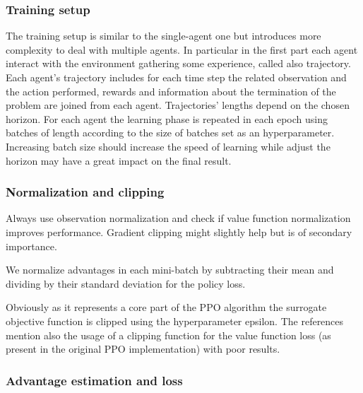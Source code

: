 \documentclass[11pt, a4paper, hidelinks]{report}
\begin{document}

\subsubsection{Training setup}

The training setup is similar to the single-agent one but introduces more complexity to deal with multiple agents.
In particular in the first part each agent interact with the environment gathering some experience, called also trajectory.
Each agent's trajectory includes for each time step the related observation and the action performed, rewards and information about the termination of the problem are joined from each agent.
Trajectories' lengths depend on the chosen horizon.
For each agent the learning phase is repeated in each epoch using batches of length according to the size of batches set as an hyperparameter.
Increasing batch size should increase the speed of learning while adjust the horizon may have a great impact on the final result.

\subsubsection{Normalization and clipping}

\begin{quoting}[font=itshape, begintext={"}, endtext={"\cite{ppo_implementation_2}}]
Always use observation normalization and check if value function normalization improves performance.
Gradient clipping might slightly help but is of secondary importance.
\end{quoting}

We normalize advantages in each mini-batch by subtracting their mean and dividing by their standard deviation for the policy loss.


Obviously as it represents a core part of the PPO algorithm the surrogate objective function is clipped using the hyperparameter epsilon.
The references mention also the usage of a clipping function for the value function loss (as present in the original PPO implementation) with poor results.


\subsubsection{Advantage estimation and loss}
\end{document}
